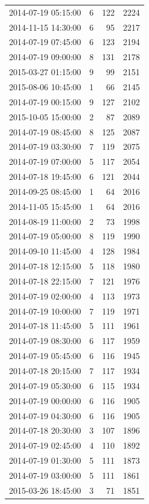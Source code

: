 \begin{tabular}{lrrr}
2014-07-19 05:15:00 & 6 & 122 & 2224 \\
2014-11-15 14:30:00 & 6 & 95 & 2217 \\
2014-07-19 07:45:00 & 6 & 123 & 2194 \\
2014-07-19 09:00:00 & 8 & 131 & 2178 \\
2015-03-27 01:15:00 & 9 & 99 & 2151 \\
2015-08-06 10:45:00 & 1 & 66 & 2145 \\
2014-07-19 00:15:00 & 9 & 127 & 2102 \\
2015-10-05 15:00:00 & 2 & 87 & 2089 \\
2014-07-19 08:45:00 & 8 & 125 & 2087 \\
2014-07-19 03:30:00 & 7 & 119 & 2075 \\
2014-07-19 07:00:00 & 5 & 117 & 2054 \\
2014-07-18 19:45:00 & 6 & 121 & 2044 \\
2014-09-25 08:45:00 & 1 & 64 & 2016 \\
2014-11-05 15:45:00 & 1 & 64 & 2016 \\
2014-08-19 11:00:00 & 2 & 73 & 1998 \\
2014-07-19 05:00:00 & 8 & 119 & 1990 \\
2014-09-10 11:45:00 & 4 & 128 & 1984 \\
2014-07-18 12:15:00 & 5 & 118 & 1980 \\
2014-07-18 22:15:00 & 7 & 121 & 1976 \\
2014-07-19 02:00:00 & 4 & 113 & 1973 \\
2014-07-19 10:00:00 & 7 & 119 & 1971 \\
2014-07-18 11:45:00 & 5 & 111 & 1961 \\
2014-07-19 08:30:00 & 6 & 117 & 1959 \\
2014-07-19 05:45:00 & 6 & 116 & 1945 \\
2014-07-18 20:15:00 & 7 & 117 & 1934 \\
2014-07-19 05:30:00 & 6 & 115 & 1934 \\
2014-07-19 00:00:00 & 6 & 116 & 1905 \\
2014-07-19 04:30:00 & 6 & 116 & 1905 \\
2014-07-18 20:30:00 & 3 & 107 & 1896 \\
2014-07-19 02:45:00 & 4 & 110 & 1892 \\
2014-07-19 01:30:00 & 5 & 111 & 1873 \\
2014-07-19 03:00:00 & 5 & 111 & 1861 \\
2015-03-26 18:45:00 & 3 & 71 & 1851 \\

\end{tabular}
